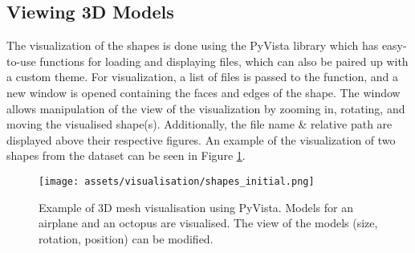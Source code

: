 \subsection{Viewing 3D Models}
The visualization of the shapes is done using the PyVista library which has easy-to-use functions for loading and
displaying files, which can also be paired up with a custom theme.
For visualization, a list of files is passed to the function, and a new window is opened containing the faces and edges of the shape.
The window allows manipulation of the view of the visualization by zooming in, rotating, and moving the visualised
shape(s).
Additionally, the file name \& relative path are displayed above their respective figures.
An example of the visualization of two shapes from the dataset can be seen in Figure \ref{fig:initial}.

\begin{figure}[ht]
  \texttt{[image: assets/visualisation/shapes\_initial.png]}
  \caption{Example of 3D mesh visualisation using PyVista. Models for an airplane and an octopus are visualised. The view of the models (size, rotation, position) can be modified.}
  \label{fig:initial}
\end{figure}
